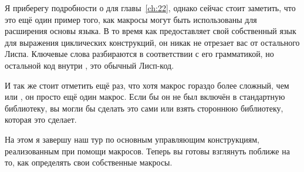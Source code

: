 Я приберегу подробности о  для главы~\ref{ch:22}, однако сейчас стоит заметить,
что это ещё один пример того, как макросы могут быть использованы для расширения основы
языка. В то время как  предоставляет свой собственный язык для выражения
циклических конструкций, он никак не отрезает вас от остального Лиспа. Ключевые слова
 разбираются в соответствии с его грамматикой, но остальной код внутри
, это обычный Лисп-код.

И так же стоит отметить ещё раз, что хотя макрос  гораздо более сложный, чем
 или , он просто ещё один макрос. Если бы он не был включён в
стандартную библиотеку, вы могли бы сделать это сами или взять стороннюю библиотеку,
которая это сделает.

На этом я завершу наш тур по основным управляющим конструкциям, реализованным при помощи
макросов. Теперь вы готовы взглянуть поближе на то, как определять свои собственные
макросы.

